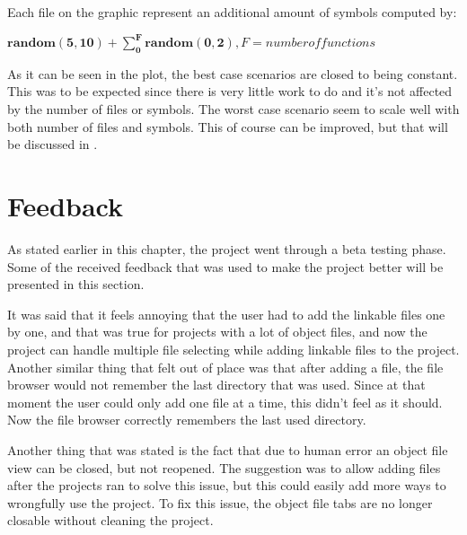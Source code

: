 
Each file on the graphic represent an additional amount of symbols computed by:

$\mathbf{random(5,10) + \sum\limits_{0}^{F} random(0,2)}, F = number of functions$

As it can be seen in the plot, the best case scenarios are closed to being constant. This was to be expected since there is very little work to do and it’s not affected by the number of files or symbols. The worst case scenario seem to scale well with both number of files and symbols. This of course can be improved, but that will be discussed in .


\section{Feedback}
\label{sec:feedback}

As stated earlier in this chapter, the project went through a beta testing phase.  Some of the received feedback that was used to make the project better will be presented in this section.

It was said that it feels annoying that the user had to add the linkable files one by one, and that was true for projects with a lot of object files, and now the project can handle multiple file selecting while adding linkable files to the project. Another similar thing that felt out of place was that after adding a file, the file browser would not remember the last directory that was used. Since at that moment the user could only add one file at a time, this didn't feel as it should. Now the file browser correctly remembers the last used directory.

Another thing that was stated is the fact that due to human error an object file view can be closed, but not reopened. The suggestion was to allow adding files after the projects ran to solve this issue, but this could easily add more ways to wrongfully use the project. To fix this issue, the object file tabs are no longer closable without cleaning the project.
